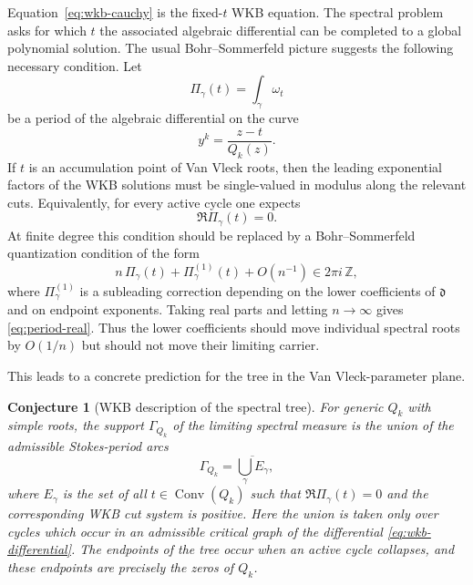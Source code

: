 \documentclass[10pt,twoside,a4paper,reqno]{amsart}
\theoremstyle{plain}
\newtheorem{conj}           {Conjecture}
\theoremstyle{definition}
\theoremstyle{remark}
\newenvironment{conjecture}{\begin{conj}}{\end{conj}}
\newcommand {\dq}{\mathfrak d}
\DeclareMathOperator{\Conv}{Conv}
\begin{document}
Equation~\eqref{eq:wkb-cauchy} is the fixed-$t$ WKB equation.  The spectral problem asks for which $t$ the associated algebraic differential can be completed to a global polynomial solution.  The usual Bohr--Sommerfeld picture suggests the following necessary condition.  Let
\[
        \Pi_\gamma(t)=\int_\gamma \omega_t
\]
be a period of the algebraic differential on the curve
\[
        y^k=\frac{z-t}{Q_k(z)}.
\]
If $t$ is an accumulation point of Van Vleck roots, then the leading exponential factors of the WKB solutions must be single-valued in modulus along the relevant cuts.  Equivalently, for every active cycle one expects
\begin{equation}
\label{eq:period-real}
        \Re \Pi_\gamma(t)=0.
\end{equation}
At finite degree this condition should be replaced by a Bohr--Sommerfeld quantization condition of the form
\begin{equation}
\label{eq:bohr-sommerfeld}
        n\,\Pi_\gamma(t)+\Pi_\gamma^{(1)}(t)+O(n^{-1})
        \in 2\pi i\,\mathbb Z,
\end{equation}
where $\Pi_\gamma^{(1)}$ is a subleading correction depending on the lower coefficients of $\dq$ and on endpoint exponents.  Taking real parts and letting $n\to\infty$ gives \eqref{eq:period-real}.  Thus the lower coefficients should move individual spectral roots by $O(1/n)$ but should not move their limiting carrier.

This leads to a concrete prediction for the tree in the Van Vleck-parameter plane.

\begin{conjecture}[WKB description of the spectral tree]
\label{conj:wkb-tree}
For generic $Q_k$ with simple roots, the support $\Gamma_{Q_k}$ of the limiting spectral measure is the union of the admissible Stokes-period arcs
\begin{equation}
\label{eq:wkb-tree-locus}
        \Gamma_{Q_k}=\overline{\bigcup_\gamma E_\gamma},
\end{equation}
where $E_\gamma$ is the set of all $t\in\Conv(Q_k)$ such that
$\Re \Pi_\gamma(t)=0$ and the corresponding WKB cut system is positive.
Here the union is taken only over cycles which occur in an admissible critical graph of the differential \eqref{eq:wkb-differential}.  The endpoints of the tree occur when an active cycle collapses, and these endpoints are precisely the zeros of $Q_k$.
\end{conjecture}
\end{document}
